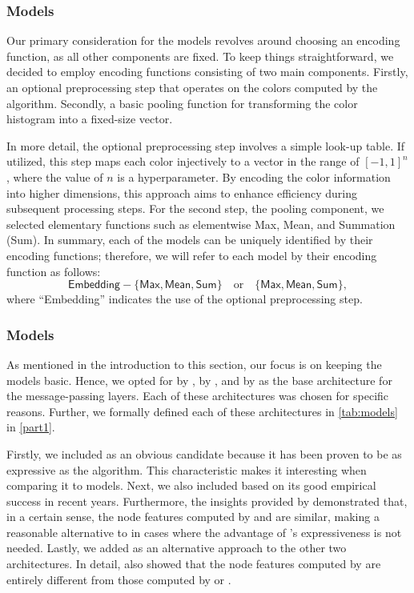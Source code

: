 \subsubsection{\wlnn Models}
Our primary consideration for the \wlnn models revolves around choosing an encoding function, as all other components are fixed. To keep things straightforward, we decided to employ encoding functions consisting of two main components. Firstly, an optional preprocessing step that operates on the colors computed by the \wl algorithm. Secondly, a basic pooling function for transforming the color histogram into a fixed-size vector.

In more detail, the optional preprocessing step involves a simple look-up table. If utilized, this step maps each color injectively to a vector in the range of $[-1, 1]^n$, where the value of $n$ is a hyperparameter. By encoding the color information into higher dimensions, this approach aims to enhance efficiency during subsequent processing steps. For the second step, the pooling component, we selected elementary functions such as elementwise \textsf{Max}, \textsf{Mean}, and Summation (\textsf{Sum}). In summary, each of the \wlnn models can be uniquely identified by their encoding functions; therefore, we will refer to each model by their encoding function as follows:
\begin{equation*}
	\textsf{Embedding}-\{\textsf{Max}, \textsf{Mean}, \textsf{Sum}\} \quad \text{or} \quad \{\textsf{Max}, \textsf{Mean}, \textsf{Sum}\},
\end{equation*}
where ``\textsf{Embedding}'' indicates the use of the optional preprocessing step.

\subsubsection{\gnn Models}\label{sec:gnn_model_choice}
As mentioned in the introduction to this section, our focus is on keeping the models basic. Hence, we opted for \gin by \cite{Xu2018}, \gcn by \cite{Kip+2017}, and \gat by \cite{Velivckovic2017} as the base architecture for the message-passing layers. Each of these architectures was chosen for specific reasons. Further, we formally defined each of these architectures in \cref{tab:models} in \cref{part1}.

Firstly, we included \gin as an obvious candidate because it has been proven to be as expressive as the \wl algorithm. This characteristic makes it interesting when comparing it to \wlnn models.
Next, we also included \gcn based on its good empirical success in recent years. Furthermore, the insights provided by \cite{Nikolentzos2023} demonstrated that, in a certain sense, the node features computed by \gcn and \gin are similar, making \gcn a reasonable alternative to \gin in cases where the advantage of \gin's expressiveness is not needed.
Lastly, we added \gat as an alternative approach to the other two architectures. In detail, \cite{Nikolentzos2023} also showed that the node features computed by \gat are entirely different from those computed by \gin or \gcn.

